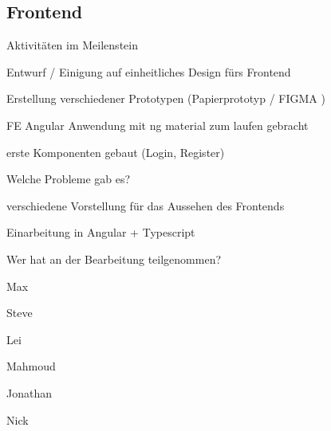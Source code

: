 \documentclass{article}
\begin{document}
\subsection{Frontend}
\begin{description}[font=$\bullet$]
\item Aktivitäten im Meilenstein
\begin{description}[font=$\bullet$]
  \item Entwurf / Einigung auf einheitliches Design fürs Frontend
  \item Erstellung verschiedener Prototypen (Papierprototyp / FIGMA )
  \item FE Angular Anwendung mit ng material zum laufen gebracht
  \item erste Komponenten gebaut (Login, Register)
\end{description}

\item Welche Probleme gab es?
\begin{description}[font=$\bullet$]
  \item verschiedene Vorstellung für das Aussehen des Frontends
  \item Einarbeitung in Angular + Typescript
\end{description}

\item Wer hat an der Bearbeitung teilgenommen?
\begin{description}[font=$\bullet$]
  \item Max \item Steve\item Lei\item Mahmoud\item Jonathan\item Nick
\end{description}

\end {description}
\end{document}
